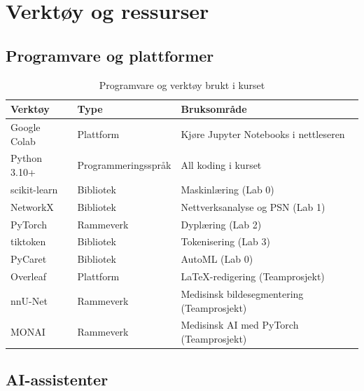 \documentclass[11pt,a4paper]{article}
\begin{document}
\section{Verktøy og ressurser}

\subsection{Programvare og plattformer}

\begin{table}[htbp]
\centering
\caption{Programvare og verktøy brukt i kurset}
\label{tab:software}
\begin{tabular}{@{}llp{6cm}@{}}
\toprule
\textbf{Verktøy} & \textbf{Type} & \textbf{Bruksområde} \\
\midrule
Google Colab & Plattform & Kjøre Jupyter Notebooks i nettleseren \\
Python 3.10+ & Programmeringsspråk & All koding i kurset \\
scikit-learn & Bibliotek & Maskinlæring (Lab 0) \\
NetworkX & Bibliotek & Nettverksanalyse og PSN (Lab 1) \\
PyTorch & Rammeverk & Dyplæring (Lab 2) \\
tiktoken & Bibliotek & Tokenisering (Lab 3) \\
PyCaret & Bibliotek & AutoML (Lab 0) \\
Overleaf & Plattform & LaTeX-redigering (Teamprosjekt) \\
nnU-Net & Rammeverk & Medisinsk bildesegmentering (Teamprosjekt) \\
MONAI & Rammeverk & Medisinsk AI med PyTorch (Teamprosjekt) \\
\bottomrule
\end{tabular}
\end{table}

\subsection{AI-assistenter}
\end{document}
